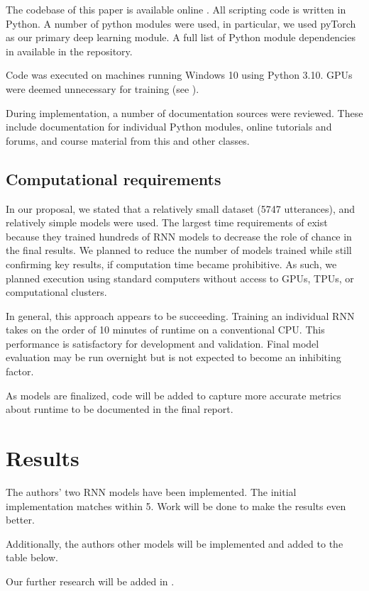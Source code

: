 \documentclass[11pt,a4paper]{article}
\begin{document}
The codebase of this paper is available online \citep{cs598_repo}. All scripting code is written in Python. A number of python modules were used, in particular, we used pyTorch as our primary deep learning module. A full list of Python module dependencies in available in the repository. 

Code was executed on machines running Windows 10 using Python 3.10. GPUs were deemed unnecessary for training (see ). 

During implementation, a number of documentation sources were reviewed. These include documentation for individual Python modules, online tutorials and forums, and course material from this and other classes.  

\subsection{Computational requirements}
\label{comp_reqs}

In our proposal, we stated that a relatively small dataset (5747 utterances), and relatively simple models were used. 
The largest time requirements of \citet{burger_2021} exist because they trained hundreds of RNN models to decrease the role of chance in the final results. We planned to reduce the number of models trained while still confirming key results, if computation time became prohibitive. As such, we planned execution using standard computers without access to GPUs, TPUs, or computational clusters. 

In general, this approach appears to be succeeding. Training an individual RNN takes on the order of 10 minutes of runtime on a conventional CPU. This performance is satisfactory for development and validation. Final model evaluation may be run overnight but is not expected to become an inhibiting factor. 

As models are finalized, code will be added to capture more accurate metrics about runtime to be documented in the final report. 

\section{Results}
The authors' two RNN models have been implemented. The initial implementation matches within 5. Work will be done to make the results even better. 

Additionally, the authors other models will be implemented and added to the table below. 

Our further research will be added in . 
\end{document}
